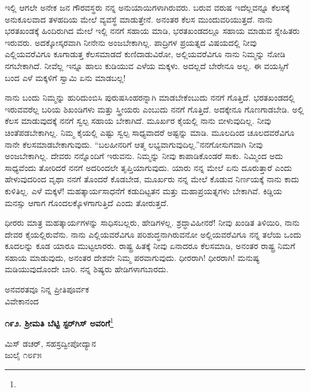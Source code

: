 ಇಲ್ಲಿ ಆಗಲೇ ಅನೇಕ ಜನ ಗೌರವಸ್ಥರು ನನ್ನ ಅನುಯಾಯಿಗಳಾಗಿರುವರು. ಬರುವ ವರುಷ ಇದೆಲ್ಲವನ್ನೂ ಕೆಲಸಕ್ಕೆ ಅನುಕೂಲವಾದ ತಳಹದಿಯ ಮೇಲೆ ವ್ಯವಸ್ಥೆ ಮಾಡುತ್ತೇನೆ. ಅನಂತರ ಕೆಲಸ ಮುಂದುವರಿಯುತ್ತದೆ. ನಾನು ಭರತಖಂಡಕ್ಕೆ ಹಿಂದಿರುಗಿದ ಮೇಲೆ ಇಲ್ಲಿ ನನಗೆ ಸಹಾಯ ಮಾಡಿ, ಭರತಖಂಡದಲ್ಲೂ ಸಹಾಯ ಮಾಡುವ ಸ್ನೇಹಿತರು ಇರುವರು. ಅದಕ್ಕೋಸ್ಕರವಾಗಿ ನೀನೇನು ಅಂಜಬೇಕಾಗಿಲ್ಲ. ಪಾದ್ರಿಗಳ ಪ್ರಯತ್ನದ ವಿಷಯದಲ್ಲಿ ನೀವು ಎಲ್ಲಿಯವರೆವಿಗೂ ಕೂಗಾಡುತ್ತ ಕೆಲಸಮಾಡದೆ ಕುಣಿದಾಡುವಿರೋ, ಅಲ್ಲಿಯವರೆವಿಗೂ ನಾನು ನಿಮ್ಮನ್ನು ನೋಡಿ ನಗಬೇಕಾಗಿದೆ. ನೀವೆಲ್ಲ ಇನ್ನೂ ಹಾಲು ಕುಡಿಯುವ ಎಳೆಯ ಮಕ್ಕಳು. ಅದಲ್ಲದೆ ಬೇರೇನೂ ಅಲ್ಲ. ಈ ವಯಸ್ಸಿಗೆ ಬಂದ ಎಳೆ ಮಕ್ಕಳಿಗೆ ಸ್ವಾಮಿ ಏನು ಮಾಡಬಲ್ಲ!

ನಾನು ಬಂದು ನಿಮ್ಮನ್ನು ಹುರಿದುಂಬಿಸಿ ಪುರುಷಸಿಂಹರನ್ನಾಗಿ ಮಾಡಬೇಕೆಂಬುದು ನನಗೆ ಗೊತ್ತಿದೆ. ಭರತಖಂಡದಲ್ಲಿ ಇರುವವರೆಲ್ಲ ಬರಿಯ ಶಿಖಂಡಿಗಳು ಮತ್ತು ಸ್ತ್ರೀಯರು ಎಂಬುದು ನನಗೆ ಗೊತ್ತಿದೆ. ಅದಕ್ಕೇನೂ ಗೊಣಗಾಡಬೇಡಿ. ಅಲ್ಲಿ ಕೆಲಸ ಮಾಡುವುದಕ್ಕೆ ನನಗೆ ಸ್ವಲ್ಪ ಸಹಾಯ ಬೇಕಾಗಿದೆ. ಮೂರ್ಖರ ಕೈಯಲ್ಲಿ ನಾನು ಬೀಳುವುದಿಲ್ಲ. ನೀವು ಚಿಂತೆಪಡಬೇಕಾಗಿಲ್ಲ. ನಿಮ್ಮ ಕೈಯಲ್ಲಿ ಎಷ್ಟು ಸ್ವಲ್ಪ ಸಾಧ್ಯವಾದರೆ ಅಷ್ಟನ್ನು ಮಾಡಿ. ಮೂಲದಿಂದ ಚೂಲದವರೆವಿಗೂ ನಾನೇ ಕೆಲಸಮಾಡಬೇಕಾಗುವುದು. “ಬಲಹೀನರಿಗೆ ಆತ್ಮ ಲಭ್ಯವಾಗುವುದಿಲ್ಲ.”ನನಗೋಸುಗವಾಗಿ ನೀವು ಅಂಜಬೇಕಾಗಿಲ್ಲ. ದೇವರು ನನ್ನೊಂದಿಗೆ ಇರುವನು. ನಿಮ್ಮನ್ನು ನೀವು ಕಾಪಾಡಿಕೊಂಡರೆ ಸಾಕು. ನಿಮ್ಮಿಂದ ಅದು ಸಾಧ್ಯವೆಂದು ತೋರಿದರೆ ನನಗೆ ಅದರಿಂದಲೇ ತೃಪ್ತಿಯಾಗುವುದು. ಯಾರು ನನ್ನ ಮೇಲೆ ಏನು ದೂರುತ್ತಾರೆ ಎಂದು ಹೇಳುವುದರಿಂದ ವೃಥಾ ನನಗೆ ತೊಂದರೆ ಕೊಡಬೇಡ, ಮೂರ್ಖರು ನನ್ನ ಮೇಲೆ ಕೊಡುವ ನಿರ್ಣಯಕ್ಕೆ ನಾನು ಕಾದು ಕುಳಿತಿಲ್ಲ. ಎಳೆ ಮಕ್ಕಳೆ! ಮಹತ್ಕಾರ್ಯಸಾಧನೆಗೆ ಕಡುದಿಟ್ಟತನ ಮತ್ತು ಮಹಾಪ್ರಯತ್ನಗಳು ಬೇಕಾಗಿವೆ. ಕಿಡ್ಡಿಯ ಮನಸ್ಸು ಆಗಾಗ ಗೊಂದಲಕ್ಕೊಳಗಾಗುತ್ತಿದೆ ಎಂದು ತೋರುತ್ತದೆ.

ಧೀರರು ಮಾತ್ರ ಮಹತ್ಕಾರ್ಯಗಳನ್ನು ಸಾಧಿಸಬಲ್ಲರು, ಹೇಡಿಗಳಲ್ಲ. ಶ್ರದ್ಧಾವಿಹೀನರೆ! ನೀವು ಖಂಡಿತ ತಿಳಿಯಿರಿ, ನಾನು ದೇವರ ಕೈಯಲ್ಲಿರುವೆನು. ನಾನು ಎಲ್ಲಿಯವರೆವಿಗೂ ಪರಿಶುದ್ಧನಾಗಿರುವನೋ ಅಲ್ಲಿಯವರೆವಿಗೂ ನನ್ನ ತಲೆಯ ಒಂದು ಕೂದಲನ್ನು ಕೂಡ ಯಾರೂ ಮುಟ್ಟಲಾರರು. ರಾಷ್ಟ್ರ ಹಿತಕ್ಕೆ ನೀವು ಏನಾದರೂ ಕೆಲಸಮಾಡಿ, ಅನಂತರ ರಾಷ್ಟ್ರ ನಿಮಗೆ ಸಹಾಯ ಮಾಡುವುದು, ಅನಂತರ ದೇಶವೇ ನಿಮ್ಮ ಪರವಾಗುವುದು. ಧೀರರಾಗಿ! ಧೀರರಾಗಿ! ಮನುಷ್ಯ ಮಡಿಯುವುದೊಂದೇ ಬಾರಿ. ನನ್ನ ಶಿಷ್ಯರು ಹೇಡಿಗಳಾಗ\break ಬಾರದು.

\vspace{-0.5cm}

{\flushright
ಅನವರತವೂ ನಿನ್ನ ಪ್ರೀತಿಪೂರ್ವಕ\\ವಿವೇಕಾನಂದ\par}

\begin{center}
\textbf{೧೯೨. ಶ‍್ರೀಮತಿ ಬೆಟ್ಟಿ ಸ್ಟರ್‌ಗಿಸ್ ಅವರಿಗೆ}\footnote{}
\end{center}

\vspace{-0.5cm}

\begin{flushright}
 ಮಿಸ್ ಡಚರ್‌, ಸಹಸ್ರದ್ವೀಪೋದ್ಯಾನ\\ಜುಲೈ ೧೮೯೫
\end{flushright}

